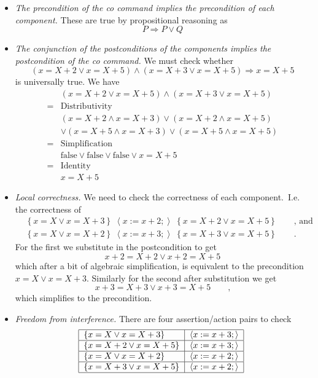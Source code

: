 \documentclass[muchmore,11pt]{article}%
\begin{document}
\begin{itemize}
\item \emph{The precondition of the co command implies the precondition of
each component.} These are true by propositional reasoning as%
\[
P\Rightarrow P\vee Q
\]


\item \emph{The conjunction of the postconditions of the components implies
the postcondition of the co command.} We must check whether%
\[
\left(  x=X+2\vee x=X+5\right)  \wedge\left(  x=X+3\vee x=X+5\right)
\Rightarrow x=X+5
\]
is universally true. We have%
\begin{align*}
&  \left(  x=X+2\vee x=X+5\right)  \wedge\left(  x=X+3\vee x=X+5\right) \\
=  &  \text{Distributivity}\\
&  \left(  x=X+2\wedge x=X+3\right)  \vee\left(  x=X+2\wedge x=X+5\right) \\
&  \vee\left(  x=X+5\wedge x=X+3\right)  \vee\left(  x=X+5\wedge x=X+5\right)
\\
=  &  \text{Simplification}\\
&  \mathrm{false}\vee\mathrm{false}\vee\mathrm{false}\vee\left.  x=X+5\right.
\\
=  &  \text{Identity}\\
&  \left.  x=X+5\right.
\end{align*}


\item \emph{Local correctness.} We need to check the correctness of each
component.\ I.e. the correctness of%
\begin{align*}
&  \left\{  x=X\vee x=X+3\right\}  \;\left\langle x:=x+2;\right\rangle
\;\left\{  x=X+2\vee x=X+5\right\}  \qquad\text{, and}\\
&  \left\{  x=X\vee x=X+2\right\}  \;\left\langle x:=x+3;\right\rangle
\;\left\{  x=X+3\vee x=X+5\right\}  \qquad\text{.}%
\end{align*}
For the first we substitute in the postcondition to get%
\[
x+2=X+2\vee x+2=X+5
\]
which after a bit of algebraic simplification, is equivalent to the
precondition $x=X\vee x=X+3$. Similarly for the second after substitution we
get%
\[
x+3=X+3\vee x+3=X+5\qquad\text{,}%
\]
which simplifies to the precondition.

\item \emph{Freedom from interference.} There are four assertion/action pairs
to check%
\[%
\begin{tabular}
[c]{|l|l|}\hline
$\{x=X\vee x=X+3\}$ & $\left\langle x:=x+3;\right\rangle $\\\hline
$\{x=X+2\vee x=X+5\}$ & $\left\langle x:=x+3;\right\rangle $\\\hline
$\{x=X\vee x=X+2\}$ & $\left\langle x:=x+2;\right\rangle $\\\hline
$\{x=X+3\vee x=X+5\}$ & $\left\langle x:=x+2;\right\rangle $\\\hline
\end{tabular}
\
\]



\end{itemize}
\end{document}
